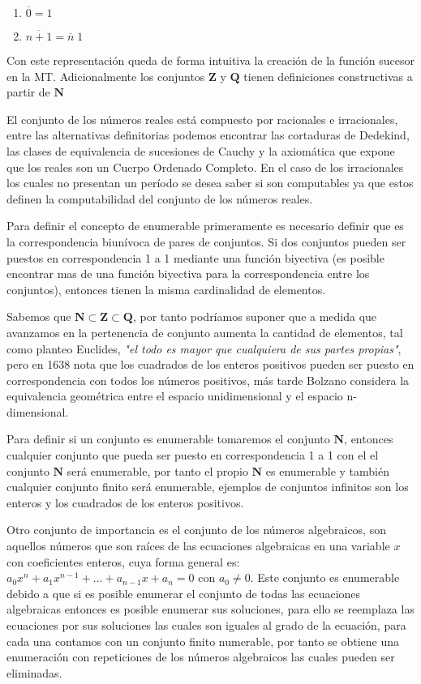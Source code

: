 \documentclass[]{article}
\begin{document}
\begin{enumerate}
	\item $\overline{0} = 1$
	\item $\overline{n + 1} = \overline{n}\;1$
\end{enumerate}

Con este representación queda de forma intuitiva la creación de la función sucesor en la MT. Adicionalmente los conjuntos $\textbf{Z}$ y $\textbf{Q}$ tienen definiciones constructivas a partir de $\textbf{N}$ 

El conjunto de los números reales está compuesto por racionales e irracionales, entre las alternativas definitorias podemos encontrar las cortaduras de Dedekind, las clases de equivalencia de sucesiones de Cauchy y la axiomática que expone que los reales son un Cuerpo Ordenado Completo. En el caso de los irracionales los cuales no presentan un período se desea saber si son computables ya que estos definen la computabilidad del conjunto de los números reales.

Para definir el concepto de enumerable primeramente es necesario definir que es la correspondencia biunívoca de pares de conjuntos. Si dos conjuntos pueden ser puestos en correspondencia 1 a 1 mediante una función biyectiva (es posible encontrar mas de una función biyectiva para la correspondencia entre los conjuntos), entonces tienen la misma cardinalidad de elementos.

Sabemos que $\textbf{N} \subset \textbf{Z} \subset \textbf{Q}$, por tanto podríamos suponer que a medida que avanzamos en la pertenencia de conjunto aumenta la cantidad de elementos, tal como planteo Euclides, \textit{"el todo es mayor que cualquiera de sus partes propias"}, pero en 1638 nota que los cuadrados de los enteros positivos pueden ser puesto en correspondencia con todos los números positivos, más tarde Bolzano considera la equivalencia geométrica entre el espacio unidimensional y el espacio n-dimensional.

Para definir si un conjunto es enumerable tomaremos el conjunto $\textbf{N}$, entonces cualquier conjunto que pueda ser puesto en correspondencia 1 a 1 con el el conjunto $\textbf{N}$ será enumerable, por tanto el propio $\textbf{N}$ es enumerable y también cualquier conjunto finito será enumerable, ejemplos de conjuntos infinitos son los enteros y los cuadrados de los enteros positivos.

Otro conjunto de importancia es el conjunto de los números algebraicos, son aquellos números que son raíces de las ecuaciones algebraicas en una variable $x$ con coeficientes enteros, cuya forma general es: $a_0x^n + a_1x^{n-1} + ... + a_{n-1}x + a_n = 0$ con $a_0 \neq 0$. Este conjunto es enumerable debido a que si es posible enumerar el conjunto de todas las ecuaciones algebraicas entonces es posible enumerar sus soluciones, para ello se reemplaza las ecuaciones por sus soluciones las cuales son iguales al grado de la ecuación, para cada una contamos con un conjunto finito numerable, por tanto se obtiene una enumeración con repeticiones de los números algebraicos las cuales pueden ser eliminadas.
\end{document}
